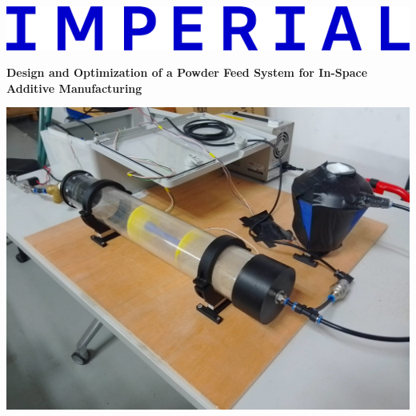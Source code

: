 \documentclass[11pt,a4paper]{report}
\begin{document}
\begin{titlepage}

    \noindent
    \begin{minipage}{0.5\textwidth}
        \includegraphics[width=\linewidth]{../report_assets/imperial.png}
    \end{minipage}
    \hfill
    
    \vspace{1cm} %
    \begin{center}
        {\huge \textbf{Design and Optimization of a Powder Feed System for In-Space Additive Manufacturing}}\\[1cm]
        
        \begin{minipage}{0.9\textwidth}
            \includegraphics[width=\linewidth]{../report_assets/cover_image.png}
        \end{minipage}
        \hfill
        
        \vspace{0.8cm} %


\end{center}
\end{titlepage}
\end{document}
